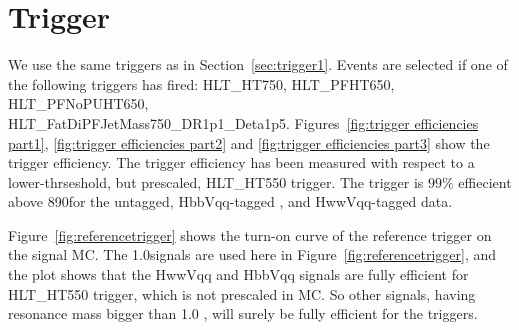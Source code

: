 \newpage

\section{Trigger}
\label{sec:trigger}

We use the same triggers as in Section~\ref{sec:trigger1}. 
Events are selected if one of the following triggers has fired:
HLT\_HT750, HLT\_PFHT650, HLT\_PFNoPUHT650, \\
HLT\_FatDiPFJetMass750\_DR1p1\_Deta1p5. Figures~\ref{fig:trigger efficiencies part1}, \ref{fig:trigger efficiencies part2} 
and \ref{fig:trigger efficiencies part3} show the trigger efficiency.
The trigger efficiency has been
measured with respect to a lower-thrseshold, but prescaled, HLT\_HT550 trigger.  
The trigger is $99\%$ effiecient above 890\GeVcc for the untagged, 
HbbVqq-tagged , and HwwVqq-tagged data.

Figure~\ref{fig:referencetrigger} shows the turn-on curve of the reference trigger on 
the signal MC. The 1.0\TeVcc signals are used here in Figure~\ref{fig:referencetrigger}, and
the plot shows that the HwwVqq and HbbVqq signals are  
fully efficient for HLT\_HT550 trigger, which is not prescaled in MC. So other signals,
having resonance mass bigger than 1.0 \TeVcc, will surely be fully efficient for the triggers. 



